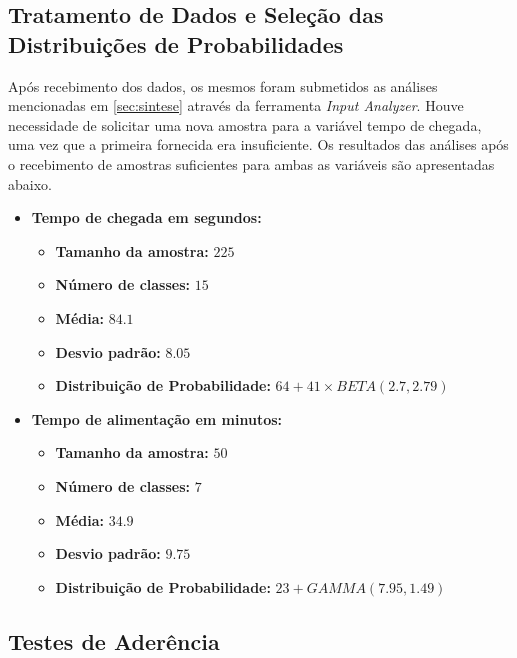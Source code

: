 \documentclass[pt,disc,oneside]{ufscpgeasthesis}
\begin{document}
            \subsection{Tratamento de Dados e Seleção das Distribuições de Probabilidades}
			\label{subsec:tratamento}
			
				Após recebimento dos dados, os mesmos foram submetidos as análises mencionadas em \ref{sec:sintese} através da ferramenta \textit{Input Analyzer}.
				Houve necessidade de solicitar uma nova amostra para a variável tempo de chegada, uma vez que a primeira fornecida era insuficiente.
				Os resultados das análises após o recebimento de amostras suficientes para ambas as variáveis são apresentadas abaixo.
				
				\begin{itemize}

					\item{\textbf{Tempo de chegada em segundos:}}
					\begin{itemize}
						\item{\textbf{Tamanho da amostra:}} $225$
						\item{\textbf{Número de classes:}} $15$
						\item{\textbf{Média:}} $84.1$
						\item{\textbf{Desvio padrão:}} $8.05$
						\item{\textbf{Distribuição de Probabilidade:}} $64 + 41 \times BETA(2.7, 2.79)$
					\end{itemize}

					\item{\textbf{Tempo de alimentação em minutos:}}
					\begin{itemize}
						\item{\textbf{Tamanho da amostra:}} $50$
						\item{\textbf{Número de classes:}} $7$
						\item{\textbf{Média:}} $34.9$
						\item{\textbf{Desvio padrão:}} $9.75$
						\item{\textbf{Distribuição de Probabilidade:}} $23 + GAMMA(7.95, 1.49)$
					\end{itemize}

				\end{itemize}

            \subsection{Testes de Aderência}
			\label{subsec:testes}
			
\end{document}

